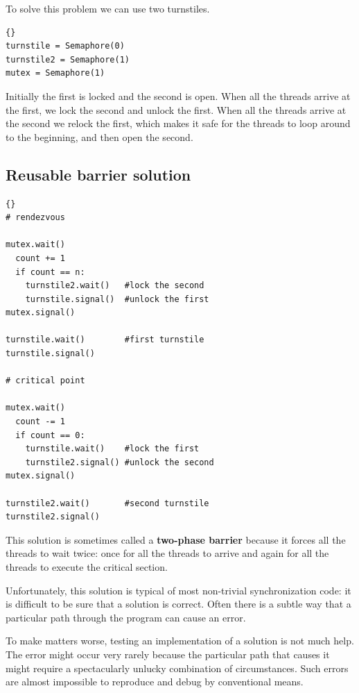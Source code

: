 \documentclass{book}
\begin{document}
To solve this problem we can use two turnstiles.

\begin{lstlisting}[title={Reusable barrier hint}]{}
turnstile = Semaphore(0)
turnstile2 = Semaphore(1)
mutex = Semaphore(1)
\end{lstlisting}

Initially the first is locked and the second is open.  When all the
threads arrive at the first, we lock the second and unlock the first.
When all the threads arrive at the second we relock the first,
which makes it safe for the threads to loop around to the beginning,
and then open the second.



\newpage
\subsection {Reusable barrier solution}

\begin{lstlisting}[title={Reusable barrier solution}]{}
# rendezvous

mutex.wait()
  count += 1
  if count == n:
    turnstile2.wait()   #lock the second
    turnstile.signal()  #unlock the first
mutex.signal()

turnstile.wait()        #first turnstile
turnstile.signal()

# critical point

mutex.wait()
  count -= 1
  if count == 0: 
    turnstile.wait()    #lock the first
    turnstile2.signal() #unlock the second
mutex.signal()

turnstile2.wait()       #second turnstile
turnstile2.signal()
\end{lstlisting}

This solution is sometimes called a {\bf two-phase barrier} because
it forces all the threads to wait twice: once for all the threads
to arrive and again for all the threads to execute the critical
section.

Unfortunately, this solution is typical of most non-trivial
synchronization code: it is difficult to be sure that a solution is
correct.  Often there is a subtle way that a particular path through
the program can cause an error.

To make matters worse, testing an implementation of a solution
is not much help.  The error might occur very rarely
because the particular path that causes it might
require a spectacularly unlucky combination of circumstances.
Such errors are almost
impossible to reproduce and debug by conventional means.
\end{document}
